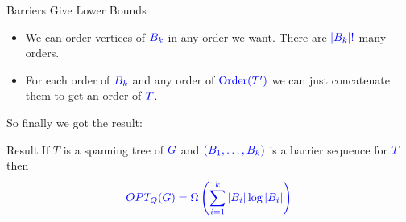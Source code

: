 \documentclass[10pt, handout]{beamer}
\DeclareMathOperator{\order}{Order}
\begin{document}
\begin{frame}{Barriers Give Lower Bounds}

	\begin{itemize}
		\item We can order vertices of $\mathcolor{blue}{B_k}$ in any order we want. There are $\mathcolor{blue}{|B_k|!}$ many orders. \pause
		\item For each order of $\mathcolor{blue}{B_k}$ and any order of $\mathcolor{blue}{\order(T')}$ we can just concatenate them to get an order of $\mathcolor{blue}{T}$.\pause
	\end{itemize}
	\vfill

	So finally we got the result:
	\begin{alertblock}{Result}
		If $T$ is a spanning tree of $\mathcolor{blue}{G}$ and $\mathcolor{blue}{(B_1,\dots, B_k)}$ is a barrier sequence for $\mathcolor{blue}{T}$ then $$\mathcolor{blue}{OPT_Q(G)=\Omega\left(\sum\limits_{i=1}^k|B_i|\log|B_i|\right)}$$
	\end{alertblock}
\end{frame}
\end{document}
